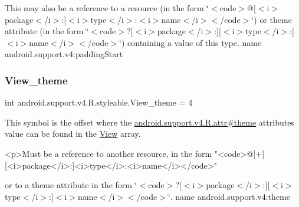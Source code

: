 This may also be a reference to a resource (in the form \char`\"{}$<$code$>$@\mbox{[}$<$i$>$package$<$/i$>$\+:\mbox{]}$<$i$>$type$<$/i$>$\+:$<$i$>$name$<$/i$>$$<$/code$>$\char`\"{}) or theme attribute (in the form \char`\"{}$<$code$>$?\mbox{[}$<$i$>$package$<$/i$>$\+:\mbox{]}\mbox{[}$<$i$>$type$<$/i$>$\+:\mbox{]}$<$i$>$name$<$/i$>$$<$/code$>$\char`\"{}) containing a value of this type.  name android.\+support.\+v4\+:padding\+Start \mbox{\label{classandroid_1_1support_1_1v4_1_1R_1_1styleable_ad8eb1747750c305519d79611a84ea08b}} 
\subsubsection{\texorpdfstring{View\+\_\+theme}{View\_theme}}
{\footnotesize\ttfamily int android.\+support.\+v4.\+R.\+styleable.\+View\+\_\+theme = 4\hspace{0.3cm}{\ttfamily [static]}}

This symbol is the offset where the \hyperlink{classandroid_1_1support_1_1v4_1_1R_1_1attr_ad29b1ce16c7b702bd1187fe041f2cda9}{android.\+support.\+v4.\+R.\+attr\#theme} attribute\textquotesingle{}s value can be found in the \hyperlink{classandroid_1_1support_1_1v4_1_1R_1_1styleable_a165672be2496e8f1adf1b075bb5fe74f}{View} array.

\begin{DoxyVerb}      <p>Must be a reference to another resource, in the form "<code>@[+][<i>package</i>:]<i>type</i>:<i>name</i></code>"
\end{DoxyVerb}
 or to a theme attribute in the form \char`\"{}$<$code$>$?\mbox{[}$<$i$>$package$<$/i$>$\+:\mbox{]}\mbox{[}$<$i$>$type$<$/i$>$\+:\mbox{]}$<$i$>$name$<$/i$>$$<$/code$>$\char`\"{}.  name android.\+support.\+v4\+:theme \mbox{\label{classandroid_1_1support_1_1v4_1_1R_1_1styleable_aef8d9a5ffe04de4b6d0f50e89e307ca4}} 
